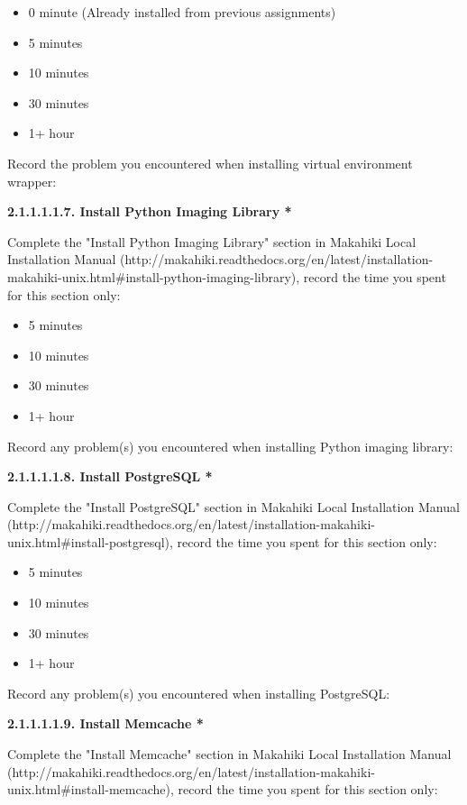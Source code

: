 \begin{itemize}
\item 0 minute (Already installed from previous assignments)
\item 5 minutes
\item  10 minutes
\item  30 minutes
\item  1+ hour
\end{itemize}

Record the problem you encountered when installing virtual environment wrapper:

{\bf 2.1.1.1.1.7. Install Python Imaging Library *}

Complete the "Install Python Imaging Library" section in Makahiki Local Installation Manual (http://makahiki.readthedocs.org/en/latest/installation-makahiki-unix.html\#install-python-imaging-library), record the time you spent for this section only:

\begin{itemize}
\item 5 minutes
\item  10 minutes
\item  30 minutes
\item  1+ hour
\end{itemize}

Record any problem(s) you encountered when installing Python imaging library:

{\bf 2.1.1.1.1.8. Install PostgreSQL *}

Complete the "Install PostgreSQL" section in Makahiki Local Installation Manual (http://makahiki.readthedocs.org/en/latest/installation-makahiki-unix.html\#install-postgresql), record the time you spent for this section only:

\begin{itemize}
\item 5 minutes
\item  10 minutes
\item  30 minutes
\item  1+ hour
\end{itemize}

Record any problem(s) you encountered when installing PostgreSQL:

{\bf 2.1.1.1.1.9. Install Memcache *}

Complete the "Install Memcache" section in Makahiki Local Installation Manual (http://makahiki.readthedocs.org/en/latest/installation-makahiki-unix.html\#install-memcache), record the time you spent for this section only:

